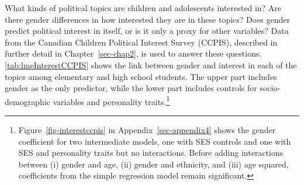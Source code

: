 \documentclass[
  letterpaper,
  DIV=11,
  numbers=noendperiod]{scrreprt}
\begin{document}
What kinds of political topics are children and adolescents interested
in? Are there gender differences in how interested they are in these
topics? Does gender predict political interest in itself, or is it only
a proxy for other variables? Data from the Canadian Children Political
Interest Survey (CCPIS), described in further detail in
Chapter~\ref{sec-chap2}, is used to answer these questions.
\ref{tab:lmeInterestCCPIS} shows the link between gender and interest in
each of the topics among elementary and high school students. The upper
part includes gender as the only predictor, while the lower part
includes controls for socio-demographic variables and personality
traits.\footnote{Figure~\ref{fig-interestccpis} in
  Appendix~\ref{sec-appendix4} shows the gender coefficient for two
  intermediate models, one with SES controls and one with SES and
  personality traits but no interactions. Before adding interactions
  between (i) gender and age, (ii) gender and ethnicity, and (iii) age
  squared, coefficients from the simple regression model remain
  significant.}
\end{document}
